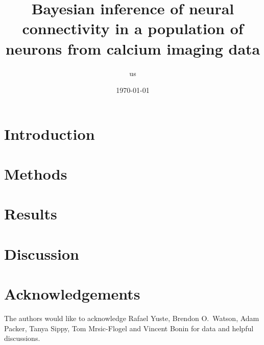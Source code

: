 \documentclass[11pt]{article}
\begin{document}
\author{us}

\date{\today}

\title{Bayesian inference of neural connectivity in a population of neurons from 
calcium imaging data}


\maketitle
\tableofcontents

\begin{abstract}

\end{abstract}

\section{Introduction}
\label{intro}


\section{Methods}
\label{sec:methods}



\section{Results}
\label{sec:results}


\clearpage
\section{Discussion}
\label{sec:discussion}


\section*{Acknowledgements}
The authors would like to acknowledge Rafael Yuste, Brendon O.\ Watson, Adam Packer, Tanya Sippy, Tom Mrsic-Flogel and Vincent Bonin for data and helpful discussions.


% 

\end{document}
